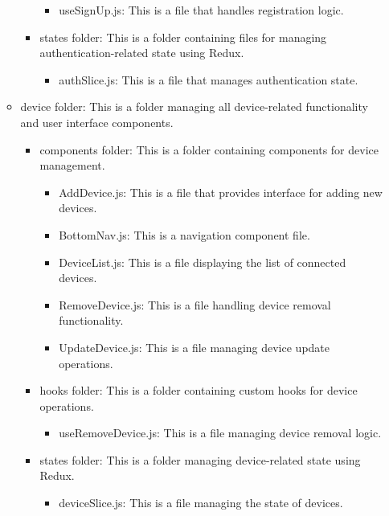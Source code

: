 \documentclass[conference]{IEEEtran}
\begin{document}
\begin{itemize}
\begin{itemize}
\begin{itemize}
\begin{itemize}
	      	      	      	\item useSignUp.js: This is a file that handles registration logic.
	      	      	      \end{itemize}
	      	      	\item states folder: This is a folder containing files for managing authentication-related state using Redux.
	      	      	      \begin{itemize}
	      	      	      	\item authSlice.js: This is a file that manages authentication state.
	      	      	      \end{itemize}
	      	      \end{itemize}
	      	\item device folder: This is a folder managing all device-related functionality and user interface components.
	      	      \begin{itemize}
	      	      	\item components folder: This is a folder containing components for device management.
	      	      	      \begin{itemize}
	      	      	      	\item AddDevice.js: This is a file that provides interface for adding new devices.
	      	      	      	\item BottomNav.js: This is a navigation component file.
	      	      	      	\item DeviceList.js: This is a file displaying the list of connected devices.
	      	      	      	\item RemoveDevice.js: This is a file handling device removal functionality.
	      	      	      	\item UpdateDevice.js: This is a file managing device update operations.
	      	      	      \end{itemize}
	      	      	\item hooks folder: This is a folder containing custom hooks for device operations.
	      	      	      \begin{itemize}
	      	      	      	\item useRemoveDevice.js: This is a file managing device removal logic.
	      	      	      \end{itemize}
	      	      	\item states folder: This is a folder managing device-related state using Redux.
	      	      	      \begin{itemize}
	      	      	      	\item deviceSlice.js: This is a file managing the state of devices.

\end{itemize}
\end{itemize}
\end{itemize}
\end{itemize}
\end{document}
